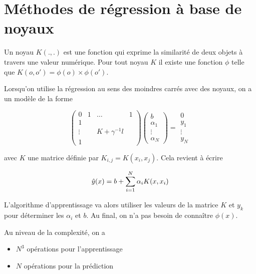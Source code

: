 	
\section{Méthodes de régression à base de noyaux}
	
Un noyau $K(., .)$ est une fonction qui exprime la similarité de deux objets à travers une valeur numérique. Pour tout noyau $K$ il existe une fonction $\phi$ telle que $K(o, o') = \phi(o) \times \phi(o')$.


Lorsqu'on utilise la régression au sens des moindres carrés avec des noyaux, on a un modèle de la forme

$$\begin{pmatrix}
0 & 1 & \dots & 1 \\ 
1 &   &   &   \\ 
\vdots &   & K + \gamma^{-1}l &   \\ 
1 &   &   &  
\end{pmatrix} \begin{pmatrix}
b \\ 
\alpha_1 \\ 
\vdots \\ 
\alpha_N
\end{pmatrix} = \begin{array}{c}
0 \\ 
y_1 \\ 
\vdots \\ 
y_N
\end{array} $$

avec $K$ une matrice définie par $K_{i, j} = K(x_i, x_j)$. Cela revient à écrire

$$\hat{y}(x) = b + \sum_{i = 1}^N \alpha_i K(x, x_i)$$

L'algorithme d'apprentissage va alors utiliser les valeurs de la matrice $K$ et $y_k$ pour déterminer les $\alpha_i$ et $b$. Au final, on n'a pas besoin de connaître $\phi(x)$.

Au niveau de la complexité, on a 

\begin{itemize}
	\item $N^3$ opérations pour l'apprentissage
	\item $N$ opérations pour la prédiction
\end{itemize}

	


